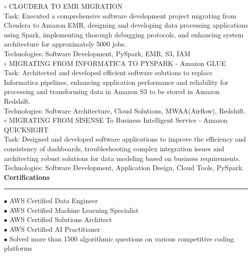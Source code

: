 \documentclass[11pt,a4paper]{article}
\renewcommand{\section}[1]{%
  \vspace{12pt}%
  {\large\bfseries #1}%
  \vspace{6pt}%
  \hrule%
  \vspace{6pt}%
}
\begin{document}
\hspace{0.5cm}$\circ$ CLOUDERA TO EMR MIGRATION\\[0.1cm]
Task: Executed a comprehensive software development project migrating from Cloudera to Amazon EMR, designing and developing data processing applications using Spark, implementing thorough debugging protocols, and enhancing system architecture for approximately 5000 jobs.\\[0.2cm]
Technologies: Software Development, PySpark, EMR, S3, IAM\\[0.2cm]
\hspace{0.5cm}$\circ$ MIGRATING FROM INFORMATICA TO PYSPARK - Amazon GLUE\\[0.1cm]
Task: Architected and developed efficient software solutions to replace Informatica pipelines, enhancing application performance and reliability for processing and transforming data in Amazon S3 to be stored in Amazon Redshift.\\[0.2cm]
Technologies: Software Architecture, Cloud Solutions, MWAA(Airflow), Redshift.\\[0.2cm]
\hspace{0.5cm}$\circ$ MIGRATING FROM SISENSE To Business Intelligent Service - Amazon QUICKSIGHT\\[0.1cm]
Task: Designed and developed software applications to improve the efficiency and consistency of dashboards, troubleshooting complex integration issues and architecting robust solutions for data modeling based on business requirements.\\[0.2cm]
Technologies: Software Development, Application Design, Cloud Tools, PySpark.\\[0.2cm]
\section{Certifications}

\noindent $\bullet$ AWS Certified Data Engineer\\[0.2cm]
\noindent $\bullet$ AWS Certified Machine Learning Specialist\\[0.2cm]
\noindent $\bullet$ AWS Certified Solutions Architect\\[0.2cm]
\noindent $\bullet$ AWS Certified AI Practitioner\\[0.2cm]
\noindent $\bullet$ Solved more than 1500 algorithmic questions on various competitive coding platforms\\[0.2cm]
\end{document}
